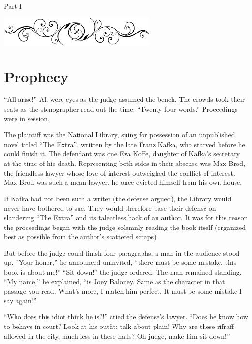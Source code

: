 \documentclass[oneside]{book}
\begin{document}
\vspace{.1in}

{
\center
\Huge
Part I
\par
}

\vspace{.25in}
{
\center
\includegraphics[width=300px]{yydiv.eps}
\par
}

\chapter{Prophecy}


``All arise!''  All were eyes as the judge assumed the bench.  The crowds took their seats as the stenographer
read out the time:  ``Twenty four words.''  Proceedings were in session.

The plaintiff was the National Library,
suing for possession of an unpublished novel titled ``The Extra'',
written by the late Franz Kafka, who starved before he could
finish it.  The defendant was one Eva Koffe, daughter of Kafka's secretary
at the time of his death.  Representing both sides in their absense was Max Brod,
the friendless lawyer whose love of interest outweighed
the conflict of interest.  Max Brod was such a mean lawyer,
he once evicted himself from his own house.

If Kafka had not been such a writer (the defense argued),
the Library would never have bothered to sue.
They would therefore base their defense on slandering ``The
Extra'' and its talentless hack of an author.  It was for this
reason the proceedings began with the
judge solemnly reading the book itself (organized
best as possible from the author's scattered scraps).

But before the judge could finish four paragraphs, a man in the audience stood up.
``Your honor,'' he announced uninvited, ``there must be some mistake, this book is
about me!''  ``Sit down!'' the judge ordered.  The man remained standing.  ``My name,''
he explained, ``is Joey Baloney.  Same as the character in that passage you read.
What's more, I match him perfect.  It must be some mistake I say again!''

``Who does this idiot think he is?!'' cried the defense's lawyer.
``Does he know how to behave in court?  Look at his outfit: talk about plain!
Why are these rifraff allowed in the city, much less in these halls?
Oh judge, make him sit down!''
\end{document}
